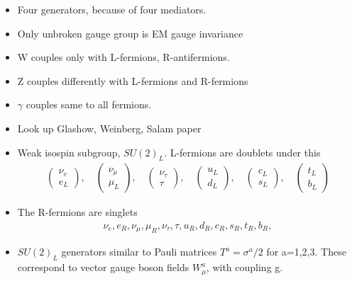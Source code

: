 \begin{itemize}
\begin{itemize}
        \item Four generators, because of four mediators. \cite{wells}
        \item Only unbroken gauge group is EM gauge invariance \cite{wells}
        \item W couples only with L-fermions, R-antifermions. \cite{wells}
        \item Z couples differently with L-fermions and R-fermions \cite{wells}
        \item $\gamma$ couples same to all fermions. \cite{wells}
        \item Look up Glashow, Weinberg, Salam paper \cite{wells}
        \item Weak isospin subgroup, $SU(2)_L$. L-fermions are doublets under this \cite{wells}
            \begin{equation}\begin{split}
            \begin{pmatrix}\nu_e\\e_L\end{pmatrix},\quad
            \begin{pmatrix}\nu_\mu\\\mu_L\end{pmatrix},\quad
            \begin{pmatrix}\nu_\tau\\\tau\end{pmatrix},\quad
            \begin{pmatrix}u_L\\d_L\end{pmatrix},\quad
            \begin{pmatrix}c_L\\s_L\end{pmatrix},\quad
            \begin{pmatrix}t_L\\b_L\end{pmatrix}
            \end{split}\end{equation}
        \item The R-fermions are singlets \cite{wells}
            \begin{equation}\begin{split}
            \nu_e,e_R,
            \nu_\mu,\mu_R,
            \nu_\tau,\tau,
            u_R,d_R,
            c_R,s_R,
            t_R,b_R,
            \end{split}\end{equation}
        \item $SU(2)_L$ generators similar to Pauli matrices $T^a=\sigma^a/2$ for a=1,2,3. These correspond to vector gauge boson fields $W_\mu^a$, with coupling g. \cite{wells}

\end{itemize}
\end{itemize}

